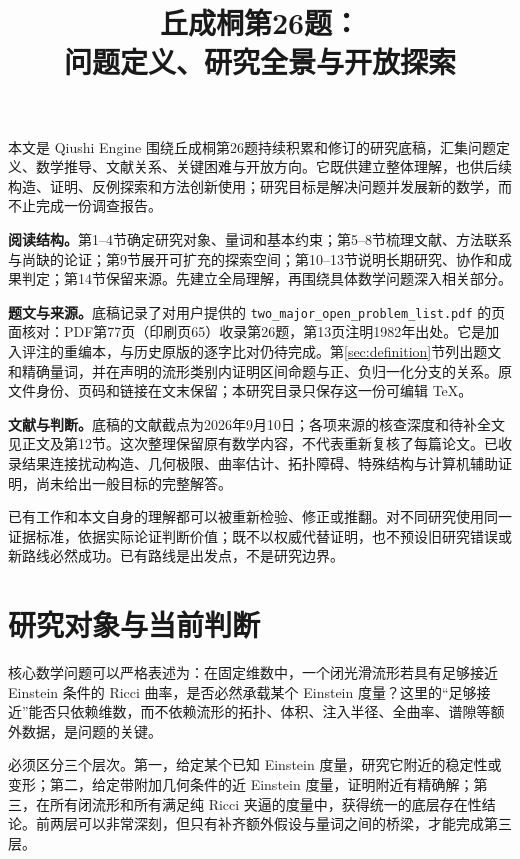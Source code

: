 \documentclass[11pt,a4paper]{article}
\title{丘成桐第26题：\\问题定义、研究全景与开放探索}
\author{}\date{}
\theoremstyle{definition}
\begin{document}
\maketitle
\vspace{-2em}

本文是 Qiushi Engine 围绕丘成桐第26题持续积累和修订的研究底稿，汇集问题定义、数学推导、文献关系、关键困难与开放方向。它既供建立整体理解，也供后续构造、证明、反例探索和方法创新使用；研究目标是解决问题并发展新的数学，而不止完成一份调查报告。

\textbf{阅读结构。}第1--4节确定研究对象、量词和基本约束；第5--8节梳理文献、方法联系与尚缺的论证；第9节展开可扩充的探索空间；第10--13节说明长期研究、协作和成果判定；第14节保留来源。先建立全局理解，再围绕具体数学问题深入相关部分。

\textbf{题文与来源。}底稿记录了对用户提供的 \texttt{two\_major\_open\_problem\_list.pdf} 的页面核对：PDF第77页（印刷页65）收录第26题，第13页注明1982年出处。它是加入评注的重编本，与历史原版的逐字比对仍待完成。第\ref{sec:definition}节列出题文和精确量词，并在声明的流形类别内证明区间命题与正、负归一化分支的关系。原文件身份、页码和链接在文末保留；本研究目录只保存这一份可编辑 TeX。

\textbf{文献与判断。}底稿的文献截点为2026年9月10日；各项来源的核查深度和待补全文见正文及第12节。这次整理保留原有数学内容，不代表重新复核了每篇论文。已收录结果连接扰动构造、几何极限、曲率估计、拓扑障碍、特殊结构与计算机辅助证明，尚未给出一般目标的完整解答。

已有工作和本文自身的理解都可以被重新检验、修正或推翻。对不同研究使用同一证据标准，依据实际论证判断价值；既不以权威代替证明，也不预设旧研究错误或新路线必然成功。已有路线是出发点，不是研究边界。

\tableofcontents
\newpage

\section{研究对象与当前判断}

核心数学问题可以严格表述为：在固定维数中，一个闭光滑流形若具有足够接近 Einstein 条件的 Ricci 曲率，是否必然承载某个 Einstein 度量？这里的“足够接近”能否只依赖维数，而不依赖流形的拓扑、体积、注入半径、全曲率、谱隙等额外数据，是问题的关键。

必须区分三个层次。第一，给定某个已知 Einstein 度量，研究它附近的稳定性或变形；第二，给定带附加几何条件的近 Einstein 度量，证明附近有精确解；第三，在所有闭流形和所有满足纯 Ricci 夹逼的度量中，获得统一的底层存在性结论。前两层可以非常深刻，但只有补齐额外假设与量词之间的桥梁，才能完成第三层。
\end{document}
